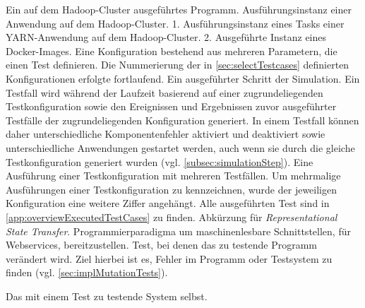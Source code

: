     {Ein auf dem Hadoop-Cluster ausgeführtes Programm.}
    {Ausführungsinstanz einer Anwendung auf dem Hadoop-Cluster.}
    {1. Ausführungsinstanz eines Tasks einer YARN-Anwendung auf dem Hadoop-Cluster.
        2. Ausgeführte Instanz eines Docker-Images.}
    {Eine Konfiguration bestehend aus mehreren Parametern, die einen Test definieren.
        Die Nummerierung der in \cref{sec:selectTestcases} definierten Konfigurationen erfolgte fortlaufend.}
    {Ein ausgeführter Schritt der Simulation.
        Ein Testfall wird während der Laufzeit basierend auf einer zugrundeliegenden Testkonfiguration sowie den Ereignissen und Ergebnissen zuvor ausgeführter Testfälle der zugrundeliegenden Konfiguration generiert.
        In einem Testfall können daher unterschiedliche Komponentenfehler aktiviert und deaktiviert sowie unterschiedliche Anwendungen gestartet werden, auch wenn sie durch die gleiche Testkonfiguration generiert wurden (vgl. \cref{subsec:simulationStep}).}
    {Eine Ausführung einer Testkonfiguration mit mehreren Testfällen.
        Um mehrmalige Ausführungen einer Testkonfiguration zu kennzeichnen, wurde der jeweiligen Konfiguration eine weitere Ziffer angehängt.
        Alle ausgeführten Test sind in \cref{app:overviewExecutedTestCases} zu finden.}
    {Abkürzung für \emph{Representational State Transfer}.
        Programmierparadigma um maschinenlesbare Schnittstellen, \zB für Webservices, bereitzustellen.}
    {Test, bei denen das zu testende Programm verändert wird.
        Ziel hierbei ist es, Fehler im Programm oder Testsystem zu finden (vgl. \cref{sec:implMutationTests}).}

    {Das mit einem Test zu testende System selbst.}
